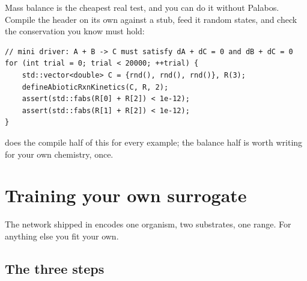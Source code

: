 Mass balance is the cheapest real test, and you can do it without Palabos.
Compile the header on its own against a stub, feed it random states, and check
the conservation you know must hold:

\begin{lstlisting}[style=cpp]
// mini driver: A + B -> C must satisfy dA + dC = 0 and dB + dC = 0
for (int trial = 0; trial < 20000; ++trial) {
    std::vector<double> C = {rnd(), rnd(), rnd()}, R(3);
    defineAbioticRxnKinetics(C, R, 2);
    assert(std::fabs(R[0] + R[2]) < 1e-12);
    assert(std::fabs(R[1] + R[2]) < 1e-12);
}
\end{lstlisting}

 does the compile half of this for every example; the
balance half is worth writing for your own chemistry, once.

\chapter{Training your own surrogate}
\label{ch:trainsurrogate}

The network shipped in  encodes one organism, two
substrates, one range. For anything else you fit your own.


\section{The three steps}

